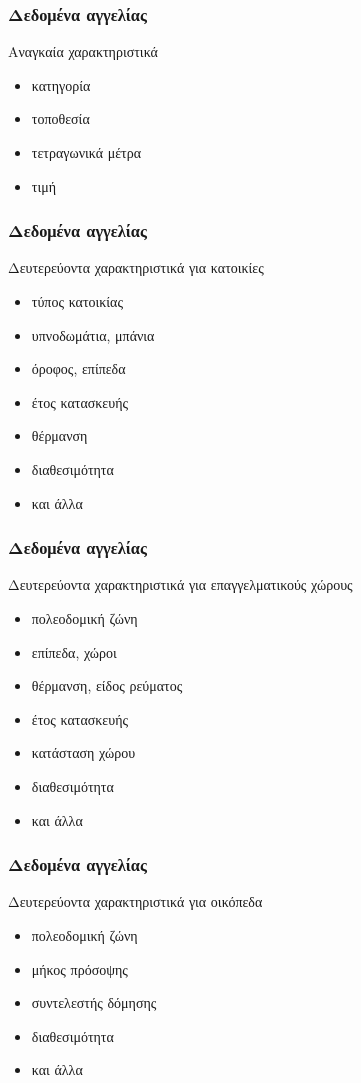 \documentclass{beamer}
\begin{document}
\begin{frame}
	\frametitle{Δεδομένα αγγελίας}

	Αναγκαία χαρακτηριστικά

	\begin{itemize}
		\item κατηγορία
		\item τοποθεσία
		\item τετραγωνικά μέτρα
		\item τιμή
	\end{itemize}
\end{frame}

\begin{frame}
	\frametitle{Δεδομένα αγγελίας}

	Δευτερεύοντα χαρακτηριστικά για κατοικίες

	\begin{itemize}
		\item τύπος κατοικίας
		\item υπνοδωμάτια, μπάνια
		\item όροφος, επίπεδα
		\item έτος κατασκευής
		\item θέρμανση
		\item διαθεσιμότητα
		\item και άλλα
	\end{itemize}
\end{frame}

\begin{frame}
	\frametitle{Δεδομένα αγγελίας}

	Δευτερεύοντα χαρακτηριστικά για επαγγελματικούς χώρους

	\begin{itemize}
		\item πολεοδομική ζώνη
		\item επίπεδα, χώροι
		\item θέρμανση, είδος ρεύματος
		\item έτος κατασκευής
		\item κατάσταση χώρου
		\item διαθεσιμότητα
		\item και άλλα
	\end{itemize}
\end{frame}

\begin{frame}
	\frametitle{Δεδομένα αγγελίας}

	Δευτερεύοντα χαρακτηριστικά για οικόπεδα

	\begin{itemize}
		\item πολεοδομική ζώνη
		\item μήκος πρόσοψης
		\item συντελεστής δόμησης
		\item διαθεσιμότητα
		\item και άλλα
	\end{itemize}
\end{frame}
\end{document}
